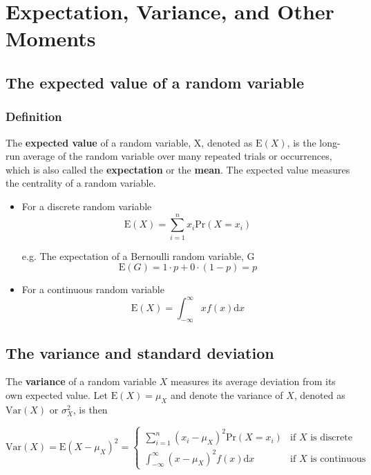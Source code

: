 \documentclass[a4paper,11pt]{article}
\begin{document}
\section{Expectation, Variance, and Other Moments}
\label{sec:org078f107}

\subsection{The expected value of a random variable}
\label{sec:orga9a58d9}

\subsubsection*{Definition}
\label{sec:org9ed329d}

The \textbf{expected value} of a random variable, X, denoted as \(\mathrm{E}(X)\), is
the long-run average of the random variable over many repeated
trials or occurrences, which is also called the \textbf{expectation} or the
\textbf{mean}. The expected value measures the centrality of a random
variable.

\begin{itemize}
\item For a discrete random variable
\[ \mathrm{E}(X) = \sum_{i=1}^n x_i \mathrm{Pr}(X = x_i) \]

e.g. The expectation of a Bernoulli random variable, G
  \[ \mathrm{E}(G) = 1 \cdot p + 0 \cdot (1-p) = p \]

\item For a continuous random variable
\[ \mathrm{E}(X) = \int_{-\infty}^{\infty} x f(x) \mathrm{d}x\]
\end{itemize}

\subsection{The variance and standard deviation}
\label{sec:org1b5351a}

The \textbf{variance} of a random variable \(X\) measures its average
deviation from its own expected value. Let \(\mathrm{E}(X) = \mu_X\) and denote
the variance of \(X\), denoted as \(\mathrm{Var}(X)\) or \(\sigma^2_X\), is then

\begin{equation*}
\mathrm{Var}(X) = \mathrm{E}(X-\mu_X)^{2}=
\begin{cases}
\sum_{i=1}^n (x_i - \mu_X)^{2}\mathrm{Pr}(X = x_i) & \text{if } X \text{ is discrete} \\
\int_{-\infty}^{\infty} (x - \mu_X)^{2}f(x)\mathrm{d} x  & \text{if } X \text{ is continuous}
\end{cases}
\end{equation*}
\end{document}
